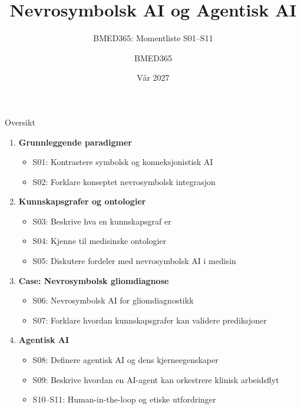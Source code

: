 \documentclass[aspectratio=169, 10pt]{beamer}
\title{Nevrosymbolsk AI og Agentisk AI}
\subtitle{BMED365: Momentliste S01--S11}
\author{BMED365}
\date{Vår 2027}
\begin{document}
\begin{frame}
    \titlepage
\end{frame}

\begin{frame}{Oversikt}
    \begin{enumerate}
        \item \textbf{Grunnleggende paradigmer}
        \begin{itemize}
            \item S01: Kontrastere symbolsk og konneksjonistisk AI
            \item S02: Forklare konseptet nevrosymbolsk integrasjon
        \end{itemize}
        \item \textbf{Kunnskapsgrafer og ontologier}
        \begin{itemize}
            \item S03: Beskrive hva en kunnskapsgraf er
            \item S04: Kjenne til medisinske ontologier
            \item S05: Diskutere fordeler med nevrosymbolsk AI i medisin
        \end{itemize}
        \item \textbf{Case: Nevrosymbolsk gliomdiagnose}
        \begin{itemize}
            \item S06: Nevrosymbolsk AI for gliomdiagnostikk
            \item S07: Forklare hvordan kunnskapsgrafer kan validere prediksjoner
        \end{itemize}
        \item \textbf{Agentisk AI}
        \begin{itemize}
            \item S08: Definere agentisk AI og dens kjerneegenskaper
            \item S09: Beskrive hvordan en AI-agent kan orkestrere klinisk arbeidsflyt
            \item S10--S11: Human-in-the-loop og etiske utfordringer
        \end{itemize}
    \end{enumerate}
\end{frame}

\end{document}
